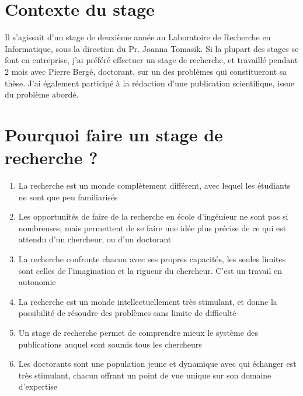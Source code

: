 \documentclass[a0,portrait]{a0poster}
\begin{document}
\vspace{1cm} %


\begin{multicols}{2} %


\section*{Contexte du stage}

Il s'agissait d'un stage de deuxième année au Laboratoire de Recherche en Informatique, sous la direction du Pr. Joanna Tomasik. Si la plupart des stages se font en entreprise, j'ai préféré effectuer un stage de recherche, et travaillé pendant 2 mois avec Pierre Bergé, doctorant, sur un des problèmes qui constitueront sa thèse. J'ai également participé à la rédaction d'une publication scientifique, issue du problème abordé.\\



\color{NavyBlue}

\section*{Pourquoi faire un stage de recherche ?}

\begin{enumerate}
\item La recherche est un monde complètement différent, avec lequel les étudiants ne sont que peu familiarisés
\item Les opportunités de faire de la recherche en école d'ingénieur ne sont pas si nombreuses, mais permettent de se faire une idée plus précise de ce qui est attendu d'un chercheur, ou d'un doctorant
\item La recherche confronte chacun avec ses propres capacités, les seules limites sont celles de l'imagination et la rigueur du chercheur. C'est un travail en autonomie
\item La recherche est un monde intellectuellement très stimulant, et donne la possibilité de résoudre des problèmes sans limite de difficulté
\item Un stage de recherche permet de comprendre mieux le système des publications auquel sont soumis tous les chercheurs
\item Les doctorants sont une population jeune et dynamique avec qui échanger est très stimulant, chacun offrant un point de vue unique sur son domaine d'expertise


\end{enumerate}
\end{multicols}
\end{document}
